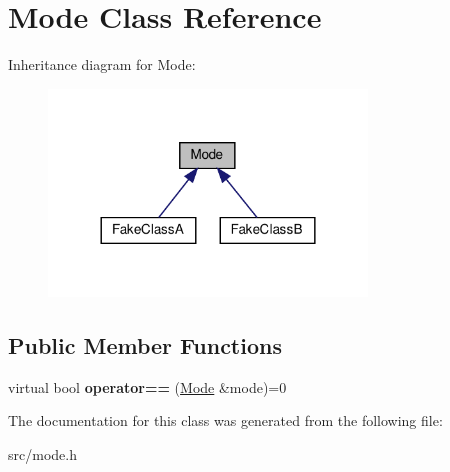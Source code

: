 \hypertarget{classMode}{}\section{Mode Class Reference}
\label{classMode}


Inheritance diagram for Mode\+:
\nopagebreak
\begin{figure}[H]
\begin{center}
\leavevmode
\includegraphics[width=240pt]{classMode__inherit__graph}
\end{center}
\end{figure}
\subsection*{Public Member Functions}
\begin{DoxyCompactItemize}
\item 
\mbox{\label{classMode_ab0b230d3a0588751380104aef6d3977c}} 
virtual bool {\bfseries operator==} (\hyperlink{classMode}{Mode} \&mode)=0
\end{DoxyCompactItemize}


The documentation for this class was generated from the following file\+:\begin{DoxyCompactItemize}
\item 
src/mode.\+h\end{DoxyCompactItemize}
